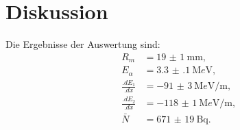 
\section{Diskussion}
\label{sec:Diskussion}

Die Ergebnisse der Auswertung sind:
\begin{align*}
R_m			&= \SI{19(1)}{\milli\metre}\text{,}\\
E_\alpha 	&= \SI{3.3(1)}{\mega e\volt}\text{,}\\
\frac{.dE_1}{.dx}	&= \SI{-91(3)}{\mega e\volt\per\metre}\text{,}\\
\frac{.dE_2}{.dx}	&= \SI{-118(1)}{\mega e\volt\per\metre}\text{,}\\
\bar{N}		&= \SI{671(19)}{\becquerel} \text{.}
\end{align*}